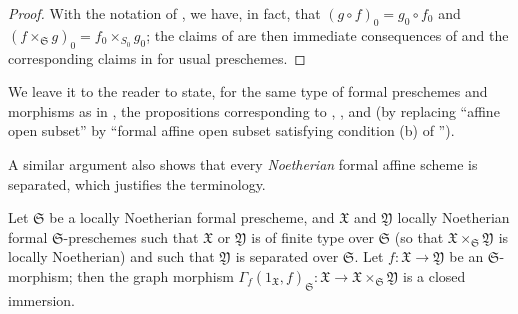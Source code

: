 \begin{proof}
\label{proof-1.10.15.3}
With the notation of , we have, in fact, that $(g\circ f)_0=g_0\circ f_0$ and $(f\times_\mathfrak{S}g)_0=f_0\times_{S_0}g_0$;
the claims of  are then immediate consequences of  and the corresponding claims in  for usual preschemes.
\end{proof}

We leave it to the reader to state, for the same type of formal preschemes and morphisms as in , the propositions corresponding to , , and 
(by replacing ``affine open subset'' by ``formal affine open subset satisfying condition (b) of '').

A similar argument also shows that every \emph{Noetherian} formal affine scheme is separated, which justifies the terminology.

\begin{proposition}[10.15.4]
\label{1.10.15.4}
Let $\mathfrak{S}$ be a locally Noetherian formal prescheme, and $\mathfrak{X}$ and $\mathfrak{Y}$ locally Noetherian formal $\mathfrak{S}$-preschemes such that $\mathfrak{X}$ or $\mathfrak{Y}$ is of finite type over $\mathfrak{S}$ (so that $\mathfrak{X}\times_\mathfrak{S}\mathfrak{Y}$ is locally Noetherian) and such that $\mathfrak{Y}$ is separated over $\mathfrak{S}$.
Let $f:\mathfrak{X}\to\mathfrak{Y}$ be an $\mathfrak{S}$-morphism; then the graph morphism $\Gamma_f(1_\mathfrak{X},f)_\mathfrak{S}:\mathfrak{X}\to\mathfrak{X}\times_\mathfrak{S}\mathfrak{Y}$ is a closed immersion.
\end{proposition}

